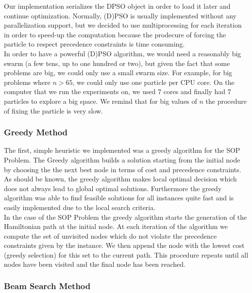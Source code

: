 \documentclass[]{article}
\begin{document}
	Our implementation serializes the DPSO object in order to load it later and continue optimization. Normally, (D)PSO is usually implemented 
	without any parallelization support, but we decided to use multiprocessing for each iteration in order to speed-up the computation because the 
	prodecure of forcing the particle to respect precedence constraints is time consuming. \\
	
	In order to have a powerful (D)PSO algorithm, we would need a reasonably big swarm (a few tens, up to one hundred or two), but given the fact 
	that some problems are big, we could only use a small swarm size. For example, for big problems where $ n > 65 $, we could only use one particle 
	per CPU core. On the computer that we run the experiments on, we used 7 cores and finally had 7 particles to explore a big space. We remind that 
	for big values of $ n $ the procedure of fixing the particle is very slow.
    
    \subsubsection{Greedy Method}

   	The first, simple heuristic we implemented was a greedy algorithm for the SOP Problem. The Greedy algorithm builds a solution starting from the initial node by choosing the the next best node in terms of cost and precedence constraints. As should be known, the greedy algorithm makes local optimal decision which does not always lead to global optimal solutions. Furthermore the greedy algorithm was able to find feasible solutions for all instances quite fast and is easily implemented due to the local search criteria. \cite{Cormen2009} \\

   	In the case of the SOP Problem the greedy algorithm starts the generation of the Hamiltonian path at the initial node. At each iteration of the 
   	algorithm we compute the set of unvisited nodes which do not violate the precedence constraints given by the instance. We then append the node 
   	with the lowest cost (greedy selection) for this set to the current path. This procedure repeats until all nodes have been visited and the final 
   	node has been reached.

    \subsubsection{Beam Search Method}
\end{document}
